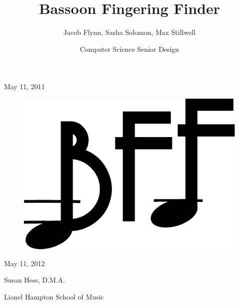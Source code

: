 \documentclass[12pt,english]{article}
\begin{document}
\title{Bassoon Fingering Finder}


\author{Jacob Flynn, Sasha Solomon, Max Stillwell}


\date{Computer Science Senior Design }

\maketitle
\begin{center}
May 11, 2011
\par\end{center}

\medskip{}


\begin{center}
\begin{figure}[H]
\centering{}\includegraphics{bff_logo1} 
\end{figure}

\par\end{center}

\pagebreak{}

\tableofcontents{}\clearpage{}

\setcounter{page}{1} 

\begin{singlespace}
\noindent \begin{flushright}
May 11, 2012
\par\end{flushright}
\end{singlespace}

\noindent Susan Hess, D.M.A.

\noindent Lionel Hampton School of Music
\end{document}
